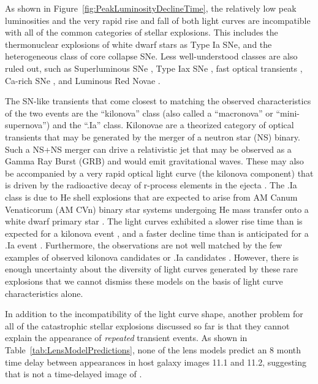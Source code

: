 As shown in Figure~\ref{fig:PeakLuminosityDeclineTime}, the relatively
low peak luminosities and the very rapid rise and fall of both \spock
light curves are incompatible with all of the common categories of
stellar explosions. This includes the thermonuclear explosions of
white dwarf stars as Type Ia SNe, and the heterogeneous class of
core collapse SNe.  Less well-understood classes are also
ruled out, such as Superluminous SNe \citep{Gal-Yam:2012,Arcavi:2016},
Type Iax SNe \citep{Li:2003,Jha:2006a,Foley:2013a}, fast optical transients
\citep{Drout:2014}, Ca-rich SNe
\citep{Filippenko:2003,Perets:2011,Kasliwal:2012}, and Luminous Red
Novae \citep[also called intermediate luminosity red
  transients;][]{Munari:2002,Kulkarni:2007,Kasliwal:2011b}.

The SN-like transients that come closest to matching the observed
characteristics of the two \spock events are the ``kilonova'' class
(also called a ``macronova'' or ``mini-supernova'') and the ``.Ia''
class.  Kilonovae are a theorized category of optical transients that
may be generated by the merger of a neutron star (NS) binary. Such a
NS+NS merger can drive a relativistic jet that may be observed as a
Gamma Ray Burst (GRB) and would emit gravitational waves.  These may
also be accompanied by a very rapid optical light curve (the kilonova
component) that is driven by the radioactive decay of r-process
elements in the ejecta \citep{Li:1998,Kulkarni:2005}.  The .Ia class
is due to He shell explosions that are expected to arise from AM Canum
Venaticorum (AM CVn) binary star systems undergoing He mass transfer
onto a white dwarf primary star \citep{Warner:1995,
  Nelemans:2005,Bildsten:2007}.  The \spock light curves exhibited a
slower rise time than is expected for a kilonova event
\citep[e.g.,][]{Metzger:2010,Barnes:2013,Kasen:2015}, and a faster
decline time than is anticipated for a .Ia event
\citep[e.g.,][]{Shen:2010}.  Furthermore, the \spock observations are not
well matched by the few examples of observed kilonova candidates
\citep{Perley:2009,Tanvir:2013} or .Ia candidates
\citep{Kasliwal:2010, Perets:2010, Poznanski:2010}.  However, there is
enough uncertainty about the diversity of light curves generated by
these rare explosions that we cannot dismiss these models on the
basis of light curve characteristics alone.

In addition to the incompatibility of the light curve shape, another
problem for all of the catastrophic stellar explosions discussed so
far is that they cannot explain the appearance of {\it repeated}
transient events.  As shown in Table~\ref{tab:LensModelPredictions}, none of
the  lens models predict an 8 month time delay between
appearances in host galaxy images 11.1 and 11.2, suggesting that
\spocktwo is not a time-delayed image of \spockone \citep[as was the
  case for the 5th image of SN Refsdal;][]{Kelly:2015a,Kelly:2016}.

